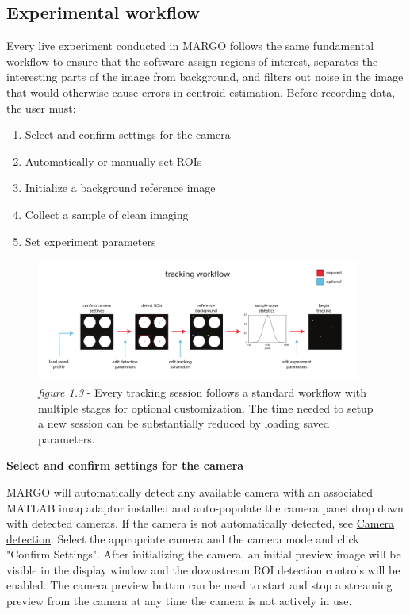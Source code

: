 \documentclass[11pt]{article}
\begin{document}
\newpage
\subsection{Experimental workflow}

Every live experiment conducted in MARGO follows the same fundamental workflow to ensure that the software assign regions of interest, separates the interesting parts of the image from background, and filters out noise in the image that would otherwise cause errors in centroid estimation. Before recording data, the user must:

\begin{enumerate}
	\itemsep0em 
	\item Select and confirm settings for the camera
	\item Automatically or manually set ROIs
	\item Initialize a background reference image
	\item Collect a sample of clean imaging
	\item Set experiment parameters
\end{enumerate}

\begin{figure}[h!]
	\begin{center}
		\includegraphics[width=0.95\textwidth]{images/getting_started/tracking_workflow.pdf}
	\end{center}
	\caption*{\footnotesize {\textit{figure 1.3} - Every tracking session follows a standard workflow with multiple stages for optional customization. The time needed to setup a new session can be substantially reduced by loading saved parameters.}}
\end{figure}

\fontsize{10}{0}
\textbf{Select and confirm settings for the camera}

MARGO will automatically detect any available camera with an associated MATLAB imaq adaptor installed and auto-populate the camera panel drop down with detected cameras. If the camera is not automatically detected, see \hyperlink{camdetect}{Camera detection}. Select the appropriate camera and the camera mode and click "Confirm Settings". After initializing the camera, an initial preview image will be visible in the display window and the downstream ROI detection controls will be enabled. The camera preview button can be used to start and stop a streaming preview from the camera at any time the camera is not actively in use.
\end{document}
